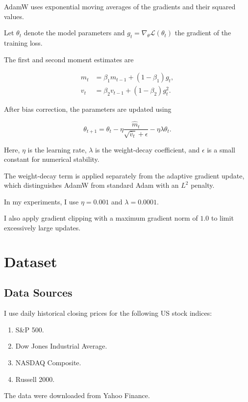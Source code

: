 \documentclass[oneside,english,11pt]{article}
\begin{document}
AdamW uses exponential moving averages
of the gradients and their squared values.

Let $\theta_t$ denote the model parameters
and $g_t=\nabla_{\theta}\mathcal{L}(\theta_t)$
the gradient of the training loss.

The first and second moment estimates are

\begin{align}
m_t &= \beta_1 m_{t-1}+(1-\beta_1)g_t,\\
v_t &= \beta_2 v_{t-1}+(1-\beta_2)g_t^2.
\end{align}

After bias correction, the parameters
are updated using

\begin{equation}
\theta_{t+1}
=
\theta_t
-
\eta\frac{\hat m_t}
{\sqrt{\hat v_t}+\epsilon}
-
\eta\lambda\theta_t.
\end{equation}

Here, $\eta$ is the learning rate,
$\lambda$ is the weight-decay coefficient,
and $\epsilon$ is a small constant
for numerical stability.

The weight-decay term is applied
separately from the adaptive gradient
update, which distinguishes AdamW
from standard Adam with an
$L^2$ penalty.

In my experiments, I use
$\eta=0.001$ and $\lambda=0.0001$.

I also apply gradient clipping with
a maximum gradient norm of $1.0$
to limit excessively large updates.


\section{Dataset}
\label{sec:data}

\subsection{Data Sources}

I use daily historical closing prices for
the following US stock indices:

\begin{enumerate}
\item S\&P 500.
\item Dow Jones Industrial Average.
\item NASDAQ Composite.
\item Russell 2000.
\end{enumerate}

The data were downloaded from Yahoo Finance.
\end{document}

